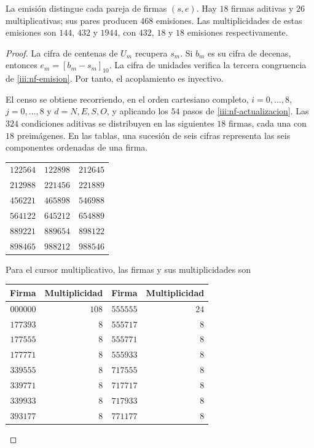 \begin{proposition}
\label{iii:nf-inyectividad}
La emisión distingue cada pareja de firmas $(s,e)$. Hay $18$ firmas
aditivas y $26$ multiplicativas; sus pares producen $468$ emisiones.
Las multiplicidades de estas emisiones son $144$, $432$ y $1944$,
con $432$, $18$ y $18$ emisiones respectivamente.
\end{proposition}

\begin{proof}
La cifra de centenas de $U_m$ recupera $s_m$. Si $b_m$ es su cifra de
decenas, entonces $e_m=[b_m-s_m]_{10}$. La cifra de unidades verifica
la tercera congruencia de \eqref{iii:nf-emision}. Por tanto, el
acoplamiento es inyectivo.

El censo se obtiene recorriendo, en el orden cartesiano completo,
$i=0,\ldots,8$, $j=0,\ldots,8$ y $d=N,E,S,O$, y aplicando los $54$
pasos de \eqref{iii:nf-actualizacion}. Las $324$ condiciones aditivas
se distribuyen en las siguientes $18$ firmas, cada una con $18$
preimágenes. En las tablas, una sucesión de seis cifras representa
las seis componentes ordenadas de una firma.
\begin{center}
\begin{tabular}{ccc}
$122564$&$122898$&$212645$\\
$212988$&$221456$&$221889$\\
$456221$&$465898$&$546988$\\
$564122$&$645212$&$654889$\\
$889221$&$889654$&$898122$\\
$898465$&$988212$&$988546$
\end{tabular}
\end{center}
Para el cursor multiplicativo, las firmas y sus multiplicidades son
\begin{center}
\begin{tabular}{rr@{\qquad}rr}
Firma&Multiplicidad&Firma&Multiplicidad\\ \hline
$000000$&$108$&$555555$&$24$\\
$177393$&$8$&$555717$&$8$\\
$177555$&$8$&$555771$&$8$\\
$177771$&$8$&$555933$&$8$\\
$339555$&$8$&$717555$&$8$\\
$339771$&$8$&$717717$&$8$\\
$339933$&$8$&$717933$&$8$\\
$393177$&$8$&$771177$&$8$\\

\end{tabular}
\end{center}
\end{proof}

